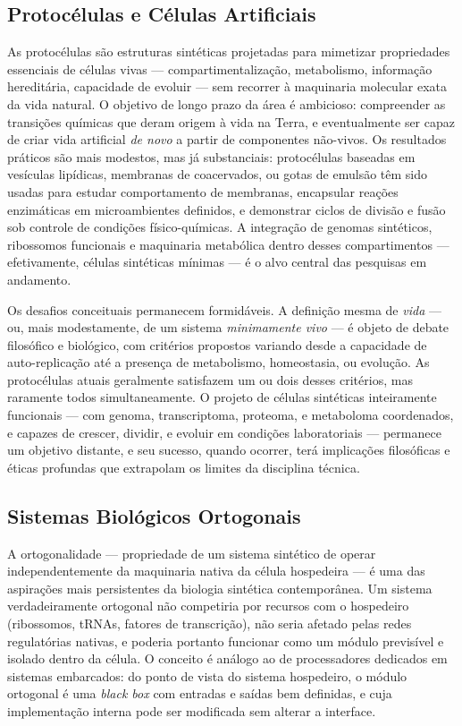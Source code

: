 \subsection{Protocélulas e Células Artificiais}

As protocélulas são estruturas sintéticas projetadas para mimetizar propriedades essenciais de células vivas --- compartimentalização, metabolismo, informação hereditária, capacidade de evoluir --- sem recorrer à maquinaria molecular exata da vida natural. O objetivo de longo prazo da área é ambicioso: compreender as transições químicas que deram origem à vida na Terra, e eventualmente ser capaz de criar vida artificial \emph{de novo} a partir de componentes não-vivos. Os resultados práticos são mais modestos, mas já substanciais: protocélulas baseadas em vesículas lipídicas, membranas de coacervados, ou gotas de emulsão têm sido usadas para estudar comportamento de membranas, encapsular reações enzimáticas em microambientes definidos, e demonstrar ciclos de divisão e fusão sob controle de condições físico-químicas. A integração de genomas sintéticos, ribossomos funcionais e maquinaria metabólica dentro desses compartimentos --- efetivamente, células sintéticas mínimas --- é o alvo central das pesquisas em andamento.

Os desafios conceituais permanecem formidáveis. A definição mesma de \emph{vida} --- ou, mais modestamente, de um sistema \emph{minimamente vivo} --- é objeto de debate filosófico e biológico, com critérios propostos variando desde a capacidade de auto-replicação até a presença de metabolismo, homeostasia, ou evolução. As protocélulas atuais geralmente satisfazem um ou dois desses critérios, mas raramente todos simultaneamente. O projeto de células sintéticas inteiramente funcionais --- com genoma, transcriptoma, proteoma, e metaboloma coordenados, e capazes de crescer, dividir, e evoluir em condições laboratoriais --- permanece um objetivo distante, e seu sucesso, quando ocorrer, terá implicações filosóficas e éticas profundas que extrapolam os limites da disciplina técnica.

\subsection{Sistemas Biológicos Ortogonais}

A ortogonalidade --- propriedade de um sistema sintético de operar independentemente da maquinaria nativa da célula hospedeira --- é uma das aspirações mais persistentes da biologia sintética contemporânea. Um sistema verdadeiramente ortogonal não competiria por recursos com o hospedeiro (ribossomos, tRNAs, fatores de transcrição), não seria afetado pelas redes regulatórias nativas, e poderia portanto funcionar como um módulo previsível e isolado dentro da célula. O conceito é análogo ao de processadores dedicados em sistemas embarcados: do ponto de vista do sistema hospedeiro, o módulo ortogonal é uma \emph{black box} com entradas e saídas bem definidas, e cuja implementação interna pode ser modificada sem alterar a interface.

